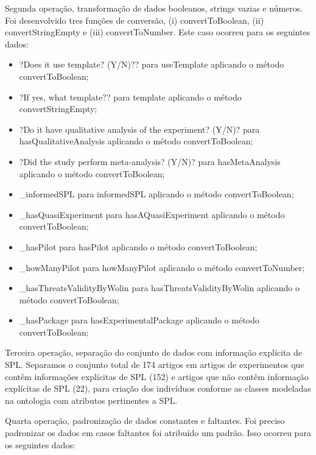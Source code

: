Segunda operação, transformação de dados booleanos, strings vazias e números. Foi desenvolvido tres funções de conversão, (i) convertToBoolean, (ii) convertStringEmpty e (iii) convertToNumber. Este caso ocorreu para os seguintes dados:

\begin{itemize}
	\item ?Does it use template? (Y/N)?? para useTemplate aplicando o método convertToBoolean;
	\item ?If yes, what template?? para template aplicando o método convertStringEmpty;
	\item ?Do it have qualitative analysis of the experiment? (Y/N)? para hasQualitativeAnalysis aplicando o método convertToBoolean;
	\item ?Did the study perform meta-analysis? (Y/N)? para hasMetaAnalysis aplicando o método convertToBoolean;
	\item \_informedSPL para informedSPL aplicando o método convertToBoolean;
	\item \_hasQuasiExperiment para hasAQuasiExperiment aplicando o método convertToBoolean;
	\item \_hasPilot para hasPilot aplicando o método convertToBoolean;
	\item \_howManyPilot para howManyPilot aplicando o método convertToNumber;
	\item \_hasThreatsValidityByWolin para hasThreatsValidityByWolin aplicando o método convertToBoolean;
	\item \_hasPackage para hasExperimentalPackage aplicando o método convertToBoolean;
\end{itemize}

Terceira operação, separação do conjunto de dados com informação explícita de SPL. Separamos o conjunto total de 174 artigos em artigos de experimentos que contêm informações explícitas de SPL (152) e artigos que não contêm informação explícitas de SPL (22), para criação dos indivíduos conforme as classes modeladas na ontologia com atributos pertinentes a SPL.

Quarta operação, padronização de dados constantes e faltantes. Foi preciso padronizar os dados em casos faltantes foi atribuído um padrão. Isso ocorreu para os seguintes dados:

